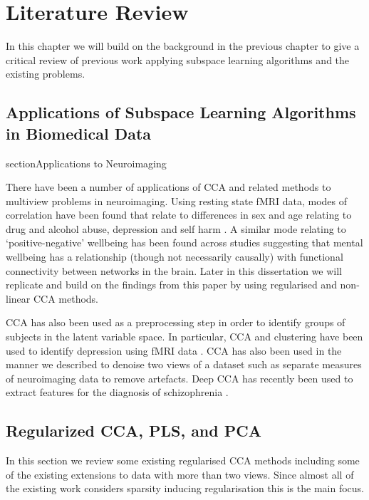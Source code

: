 \chapter{Literature Review}\label{Literature Review}

In this chapter we will build on the background in the previous chapter to give a critical review of previous work applying subspace learning algorithms and the existing problems.

\section{Applications of Subspace Learning Algorithms in Biomedical Data} 
section{Applications to Neuroimaging}

There have been a number of applications of CCA and related methods to multiview problems in neuroimaging. Using resting state fMRI data, modes of correlation have been found that relate to differences in sex and age relating to drug and alcohol abuse, depression and self harm \cite{mihalik2019brain}. A similar mode relating to `positive-negative' wellbeing has been found across studies \cite{smith2015positive} suggesting that mental wellbeing has a relationship (though not necessarily causally) with functional connectivity between networks in the brain. Later in this dissertation we will replicate and build on the findings from this paper by using regularised and non-linear CCA methods.

CCA has also been used as a preprocessing step in order to identify groups of subjects in the latent variable space. In particular, CCA and clustering have been used to identify depression using fMRI data \cite{dinga2019evaluating} \cite{drysdale2017resting}. CCA has also been used in the manner we described to denoise two views of a dataset such as separate measures of neuroimaging data \cite{zhuang2020technical} to remove artefacts. Deep CCA has recently been used to extract features for the diagnosis of schizophrenia \cite{qi2016deep}.


\section{Regularized CCA, PLS, and PCA}
In this section we review some existing regularised CCA methods including some of the existing extensions to data with more than two views. Since almost all of the existing work considers sparsity inducing regularisation this is the main focus.


